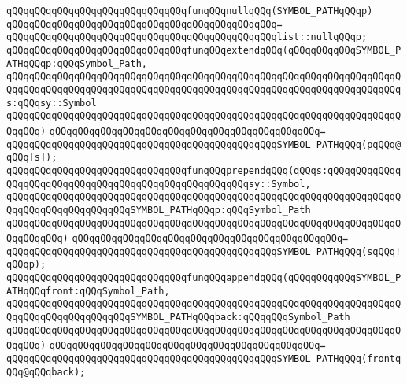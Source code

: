 \newline
\verb|qQQqqQQqqQQqqQQqqQQqqQQqqQQqqQQqfunqQQqnullqQQq(SYMBOL_PATHqQQqp)|\newline
\verb|qQQqqQQqqQQqqQQqqQQqqQQqqQQqqQQqqQQqqQQqqQQqqQQq=|\newline
\verb|qQQqqQQqqQQqqQQqqQQqqQQqqQQqqQQqqQQqqQQqqQQqqQQqlist::nullqQQqp;|\newline
\newline
\verb|qQQqqQQqqQQqqQQqqQQqqQQqqQQqqQQqfunqQQqextendqQQq(qQQqqQQqqQQqSYMBOL_PATHqQQqp:qQQqSymbol_Path,|\newline
\verb|qQQqqQQqqQQqqQQqqQQqqQQqqQQqqQQqqQQqqQQqqQQqqQQqqQQqqQQqqQQqqQQqqQQqqQQqqQQqqQQqqQQqqQQqqQQqqQQqqQQqqQQqqQQqqQQqqQQqqQQqqQQqqQQqqQQqqQQqqQQqs:qQQqsy::Symbol|\newline
\verb|qQQqqQQqqQQqqQQqqQQqqQQqqQQqqQQqqQQqqQQqqQQqqQQqqQQqqQQqqQQqqQQqqQQqqQQqqQQq)|\newline
\verb|qQQqqQQqqQQqqQQqqQQqqQQqqQQqqQQqqQQqqQQqqQQqqQQq=|\newline
\verb|qQQqqQQqqQQqqQQqqQQqqQQqqQQqqQQqqQQqqQQqqQQqqQQqSYMBOL_PATHqQQq(pqQQq@qQQq[s]);|\newline
\newline
\verb|qQQqqQQqqQQqqQQqqQQqqQQqqQQqqQQqfunqQQqprependqQQq(qQQqs:qQQqqQQqqQQqqQQqqQQqqQQqqQQqqQQqqQQqqQQqqQQqqQQqqQQqqQQqsy::Symbol,|\newline
\verb|qQQqqQQqqQQqqQQqqQQqqQQqqQQqqQQqqQQqqQQqqQQqqQQqqQQqqQQqqQQqqQQqqQQqqQQqqQQqqQQqqQQqqQQqqQQqSYMBOL_PATHqQQqp:qQQqSymbol_Path|\newline
\verb|qQQqqQQqqQQqqQQqqQQqqQQqqQQqqQQqqQQqqQQqqQQqqQQqqQQqqQQqqQQqqQQqqQQqqQQqqQQqqQQq)|\newline
\verb|qQQqqQQqqQQqqQQqqQQqqQQqqQQqqQQqqQQqqQQqqQQqqQQq=|\newline
\verb|qQQqqQQqqQQqqQQqqQQqqQQqqQQqqQQqqQQqqQQqqQQqqQQqSYMBOL_PATHqQQq(sqQQq!qQQqp);|\newline
\newline
\verb|qQQqqQQqqQQqqQQqqQQqqQQqqQQqqQQqfunqQQqappendqQQq(qQQqqQQqqQQqSYMBOL_PATHqQQqfront:qQQqSymbol_Path,|\newline
\verb|qQQqqQQqqQQqqQQqqQQqqQQqqQQqqQQqqQQqqQQqqQQqqQQqqQQqqQQqqQQqqQQqqQQqqQQqqQQqqQQqqQQqqQQqqQQqSYMBOL_PATHqQQqback:qQQqqQQqSymbol_Path|\newline
\verb|qQQqqQQqqQQqqQQqqQQqqQQqqQQqqQQqqQQqqQQqqQQqqQQqqQQqqQQqqQQqqQQqqQQqqQQqqQQq)|\newline
\verb|qQQqqQQqqQQqqQQqqQQqqQQqqQQqqQQqqQQqqQQqqQQqqQQq=|\newline
\verb|qQQqqQQqqQQqqQQqqQQqqQQqqQQqqQQqqQQqqQQqqQQqqQQqSYMBOL_PATHqQQq(frontqQQq@qQQqback);|\newline
